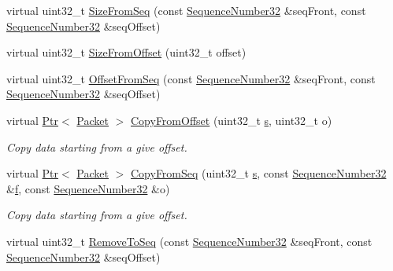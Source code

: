 \begin{DoxyCompactItemize}
virtual uint32\+\_\+t \hyperlink{classns3_1_1PendingData_a9c9f7a2ab4c522ba19f9bf219f6620e8}{Size\+From\+Seq} (const \hyperlink{group__network_gacb2070e4e98d2d5135c9bede58f07a03}{Sequence\+Number32} \&seq\+Front, const \hyperlink{group__network_gacb2070e4e98d2d5135c9bede58f07a03}{Sequence\+Number32} \&seq\+Offset)
\item 
virtual uint32\+\_\+t \hyperlink{classns3_1_1PendingData_a7224d2492c18490d1b75411db218949a}{Size\+From\+Offset} (uint32\+\_\+t offset)
\item 
virtual uint32\+\_\+t \hyperlink{classns3_1_1PendingData_ac537be2c08b079744b3b74cd70a5a66c}{Offset\+From\+Seq} (const \hyperlink{group__network_gacb2070e4e98d2d5135c9bede58f07a03}{Sequence\+Number32} \&seq\+Front, const \hyperlink{group__network_gacb2070e4e98d2d5135c9bede58f07a03}{Sequence\+Number32} \&seq\+Offset)
\item 
virtual \hyperlink{classns3_1_1Ptr}{Ptr}$<$ \hyperlink{classns3_1_1Packet}{Packet} $>$ \hyperlink{classns3_1_1PendingData_ab04639a5fcb15f47daa91c071f5cdfd2}{Copy\+From\+Offset} (uint32\+\_\+t \hyperlink{generate__test__data__lte__sinr_8m_ad83eeb3a142285d1243a08c6b7026df8}{s}, uint32\+\_\+t o)
\begin{DoxyCompactList}\small\item\em Copy data starting from a give offset. \end{DoxyCompactList}\item 
virtual \hyperlink{classns3_1_1Ptr}{Ptr}$<$ \hyperlink{classns3_1_1Packet}{Packet} $>$ \hyperlink{classns3_1_1PendingData_ac49fbeb525992b5b033d3209dcf5688c}{Copy\+From\+Seq} (uint32\+\_\+t \hyperlink{generate__test__data__lte__sinr_8m_ad83eeb3a142285d1243a08c6b7026df8}{s}, const \hyperlink{group__network_gacb2070e4e98d2d5135c9bede58f07a03}{Sequence\+Number32} \&\hyperlink{80211b_8c_ae7ffc1a8f84fa47a0812b2f2b9627132}{f}, const \hyperlink{group__network_gacb2070e4e98d2d5135c9bede58f07a03}{Sequence\+Number32} \&o)
\begin{DoxyCompactList}\small\item\em Copy data starting from a give offset. \end{DoxyCompactList}\item 
virtual uint32\+\_\+t \hyperlink{classns3_1_1PendingData_a8a55613b348dee724f3bb5bc4599a333}{Remove\+To\+Seq} (const \hyperlink{group__network_gacb2070e4e98d2d5135c9bede58f07a03}{Sequence\+Number32} \&seq\+Front, const \hyperlink{group__network_gacb2070e4e98d2d5135c9bede58f07a03}{Sequence\+Number32} \&seq\+Offset)
\item 

\end{DoxyCompactItemize}
